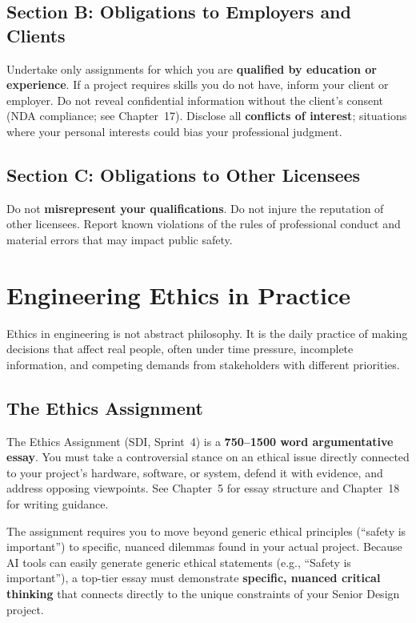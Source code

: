 \subsection{Section B: Obligations to Employers and Clients}
Undertake only assignments for which you are \textbf{qualified by education or experience}. If a project requires skills you do not have, inform your client or employer. Do not reveal confidential information without the client's consent (NDA compliance; see Chapter~17). Disclose all \textbf{conflicts of interest}; situations where your personal interests could bias your professional judgment.

\subsection{Section C: Obligations to Other Licensees}
Do not \textbf{misrepresent your qualifications}. Do not injure the reputation of other licensees. Report known violations of the rules of professional conduct and material errors that may impact public safety.

\section{Engineering Ethics in Practice}
Ethics in engineering is not abstract philosophy. It is the daily practice of making decisions that affect real people, often under time pressure, incomplete information, and competing demands from stakeholders with different priorities.

\subsection{The Ethics Assignment}
The Ethics Assignment (SDI, Sprint~4) is a \textbf{750--1500 word argumentative essay}. You must take a controversial stance on an ethical issue directly connected to your project's hardware, software, or system, defend it with evidence, and address opposing viewpoints. See Chapter~5 for essay structure and Chapter~18 for writing guidance.

The assignment requires you to move beyond generic ethical principles (``safety is important'') to specific, nuanced dilemmas found in your actual project. Because AI tools can easily generate generic ethical statements (e.g., ``Safety is important''), a top-tier essay must demonstrate \textbf{specific, nuanced critical thinking} that connects directly to the unique constraints of your Senior Design project.

